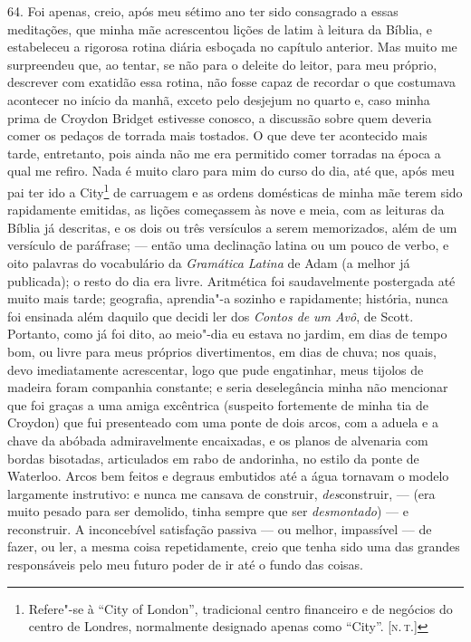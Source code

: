 64. Foi apenas, creio, após meu sétimo ano ter sido consagrado a essas
meditações, que minha mãe acrescentou lições de latim à leitura da
Bíblia, e estabeleceu a rigorosa rotina diária esboçada no capítulo
anterior. Mas muito me surpreendeu que, ao tentar, se não para o deleite
do leitor, para meu próprio, descrever com exatidão essa rotina, não
fosse capaz de recordar o que costumava acontecer no início da manhã,
exceto pelo desjejum no quarto e, caso minha prima de Croydon Bridget
estivesse conosco, a discussão sobre quem deveria comer os pedaços de
torrada mais tostados. O que deve ter acontecido mais tarde, entretanto,
pois ainda não me era permitido comer torradas na época a qual me
refiro. Nada é muito claro para mim do curso do dia, até que, após meu
pai ter ido a City\footnote{Refere"-se à ``City of London'', tradicional
  centro financeiro e de negócios do centro de Londres, normalmente
  designado apenas como ``City''. {[}\textsc{n.\,t.}{]}} de carruagem e as
ordens domésticas de minha mãe terem sido rapidamente emitidas, as
lições começassem às nove e meia, com as leituras da Bíblia já
descritas, e os dois ou três versículos a serem memorizados, além de um
versículo de paráfrase; --- então uma declinação latina ou um pouco de
verbo, e oito palavras do vocabulário da \emph{Gramática} \emph{Latina}
de Adam (a melhor já publicada); o resto do dia era livre. Aritmética
foi saudavelmente postergada até muito mais tarde; geografia, aprendia"-a
sozinho e rapidamente; história, nunca foi ensinada além daquilo que
decidi ler dos \emph{Contos de} \emph{um Avô}, de Scott. Portanto, como
já foi dito, ao meio"-dia eu estava no jardim, em dias de tempo bom, ou
livre para meus próprios divertimentos, em dias de chuva; nos quais,
devo imediatamente acrescentar, logo que pude engatinhar, meus tijolos
de madeira foram companhia constante; e seria deselegância minha não
mencionar que foi graças a uma amiga excêntrica (suspeito fortemente de
minha tia de Croydon) que fui presenteado com uma ponte de dois arcos,
com a aduela e a chave da abóbada admiravelmente encaixadas, e os planos
de alvenaria com bordas bisotadas, articulados em rabo de andorinha, no
estilo da ponte de Waterloo. Arcos bem feitos e degraus embutidos até a
água tornavam o modelo largamente instrutivo: e nunca me cansava de
construir, \emph{des}construir, --- (era muito pesado para ser demolido,
tinha sempre que ser \emph{desmontado}) --- e reconstruir. A inconcebível
satisfação passiva --- ou melhor, impassível --- de fazer, ou ler, a mesma
coisa repetidamente, creio que tenha sido uma das grandes responsáveis
pelo meu futuro poder de ir até o fundo das coisas.

